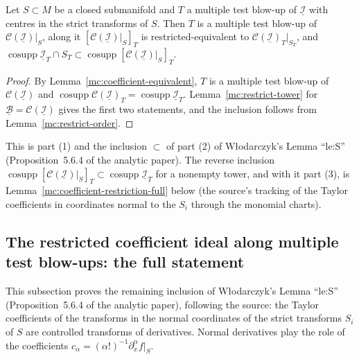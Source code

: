 \begin{lemma}
\label{mc:coefficient-restriction-tower}
\leanok
Let \(S\subset M\) be a closed submanifold and \(T\) a multiple test blow-up of \(\underline{\mathcal I}\) with centres in the strict transforms of \(S\).
Then \(T\) is a multiple test blow-up of \(\mathcal C(\underline{\mathcal I})|_S\), along it \([\mathcal C(\underline{\mathcal I})|_S]_T\) is
restricted-equivalent to \(\mathcal C(\underline{\mathcal I})_T|_{S_T}\), and
\(\operatorname{cosupp}\underline{\mathcal I}_T\cap S_T\subset\operatorname{cosupp}[\mathcal C(\underline{\mathcal I})|_S]_T\).
\end{lemma}
\begin{proof}
\leanok
By Lemma~\ref{mc:coefficient-equivalent}, \(T\) is a multiple test blow-up of \(\mathcal C(\underline{\mathcal I})\) and
\(\operatorname{cosupp}\mathcal C(\underline{\mathcal I})_T=\operatorname{cosupp}\underline{\mathcal I}_T\). Lemma~\ref{mc:restrict-tower} for
\(\underline{\mathcal B}=\mathcal C(\underline{\mathcal I})\) gives the first two statements, and the inclusion follows from Lemma~\ref{mc:restrict-order}.
\end{proof}
This is part (1) and the inclusion \(\subset\) of part (2) of Włodarczyk's Lemma ``le:S'' (Proposition~5.6.4 of the analytic paper). The reverse
inclusion \(\operatorname{cosupp}[\mathcal C(\underline{\mathcal I})|_S]_T\subset\operatorname{cosupp}\underline{\mathcal I}_T\) for a nonempty tower, and
with it part (3), is Lemma~\ref{mc:coefficient-restriction-full} below (the source's tracking of the Taylor coefficients in coordinates normal to the
\(S_i\) through the monomial charts).

\subsection{The restricted coefficient ideal along multiple test blow-ups: the full statement}

This subsection proves the remaining inclusion of Włodarczyk's Lemma ``le:S'' (Proposition~5.6.4 of the analytic paper), following the source:
the Taylor coefficients of the transforms in the normal coordinates of the strict transforms \(S_i\) of \(S\) are controlled transforms of
derivatives. Normal derivatives play the role of the coefficients \(c_\alpha=(\alpha!)^{-1}\partial^\alpha_xf|_S\).


